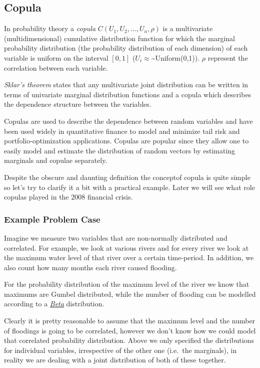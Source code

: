 \documentclass[11pt]{article}
\begin{document}
    \hypertarget{copula}{%
\subsection{Copula}\label{copula}}

In probability theory a \emph{copula} \(C(U_1, U_2, \ldots, U_n, \rho)\)
is a multivariate (multidimensional) cumulative distribution function
for which the marginal probability distribution (the probability
distribution of each dimension) of each variable is uniform on the
interval \([0, 1]\) (\(U_i \approx\)\textasciitilde{}Uniform(0,1)).
\(\rho\) represent the correlation between each variable.

\emph{Sklar's theorem} states that any multivariate joint distribution
can be written in terms of univariate marginal distribution functions
and a copula which describes the dependence structure between the
variables.

Copulas are used to describe the dependence between random variables and
have been used widely in quantitative finance to model and minimize tail
risk and portfolio-optimization applications. Copulas are popular since
they allow one to easily model and estimate the distribution of random
vectors by estimating marginals and copulae separately.

Despite the obscure and daunting definition the conceptof copula is
quite simple so let's try to clarify it a bit with a practical example.
Later we will see what role copulas played in the 2008 financial crisis.

\hypertarget{example-problem-case}{%
\subsubsection{Example Problem Case}\label{example-problem-case}}

Imagine we measure two variables that are non-normally distributed and
correlated. For example, we look at various rivers and for every river
we look at the maximum water level of that river over a certain
time-period. In addition, we also count how many months each river
caused flooding.

For the probability distribution of the maximum level of the river we
know that maximums are Gumbel distributed, while the number of flooding
can be modelled according to a
\href{https://en.wikipedia.org/wiki/Beta_distribution}{\emph{Beta}}
distribution.

Clearly it is pretty reasonable to assume that the maximum level and the
number of floodings is going to be correlated, however we don't know how
we could model that correlated probability distribution. Above we only
specified the distributions for individual variables, irrespective of
the other one (i.e.~the marginals), in reality we are dealing with a
joint distribution of both of these together.
\end{document}
